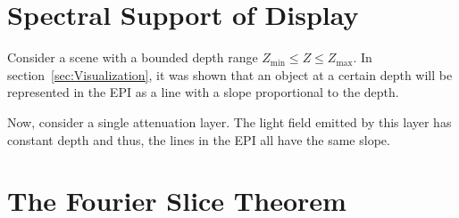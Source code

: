 \section{Spectral Support of Display}
\label{sec:Spectral_Support}

Consider a scene with a bounded depth range $Z_{\text{min}} \leq Z \leq Z_{\text{max}}$.
In section~\ref{sec:Visualization}, it was shown that an object at a certain depth will be represented in the EPI as a line with a slope proportional to the depth.



Now, consider a single attenuation layer. 
The light field emitted by this layer has constant depth and thus, the lines in the EPI all have the same slope.

\begin{figure}
	\centering
	
	\caption{}
	\label{fig:epi_fourier_transform_1}
\end{figure}

\section{The Fourier Slice Theorem}